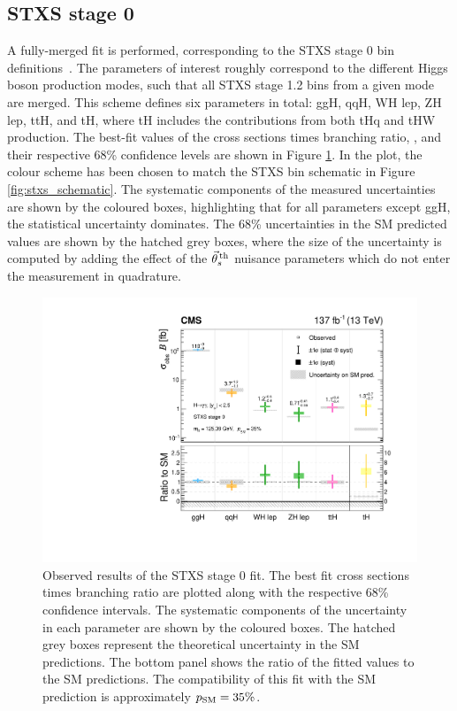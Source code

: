 \subsection{STXS stage 0}
A fully-merged fit is performed, corresponding to the STXS stage 0 bin definitions~\cite{deFlorian:2016spz}. The parameters of interest roughly correspond to the different Higgs boson production modes, such that all STXS stage 1.2 bins from a given mode are merged. This scheme defines six parameters in total: ggH, qqH, WH lep, ZH lep, ttH, and tH, where tH includes the contributions from both tHq and tHW production. The best-fit values of the cross sections times branching ratio, \xsbr, and their respective 68\% confidence levels are shown in Figure \ref{fig:stage0_results}. In the plot, the colour scheme has been chosen to match the STXS bin schematic in Figure \ref{fig:stxs_schematic}. The systematic components of the measured uncertainties are shown by the coloured boxes, highlighting that for all parameters except ggH, the statistical uncertainty dominates. The 68\% uncertainties in the SM predicted values are shown by the hatched grey boxes, where the size of the uncertainty is computed by adding the effect of the $\vec{\theta}^{\,\rm{th}}_{s}$ nuisance parameters which do not enter the measurement in quadrature.

\begin{figure}[htbp]
  \centering
  \includegraphics[width=.6\textwidth]{Figures/hgg_results/stage0_summary.pdf}
  \caption[Results of the STXS stage 0 fit]
  {
    Observed results of the STXS stage 0 fit. The best fit cross sections times branching ratio are plotted along with the respective 68\% confidence intervals. The systematic components of the uncertainty in each parameter are shown by the coloured boxes. The hatched grey boxes represent the theoretical uncertainty in the SM predictions. The bottom panel shows the ratio of the fitted values to the SM predictions. The compatibility of this fit with the SM prediction is approximately $p_{\rm{SM}}=35\%$. 
  }
  \label{fig:stage0_results}
\end{figure}

